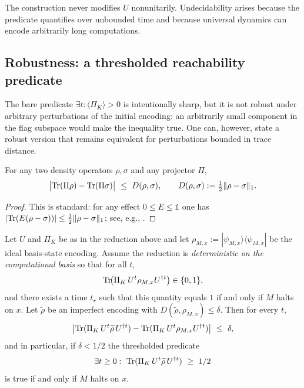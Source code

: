 \begin{remark}
The construction never modifies $U$ nonunitarily.
Undecidability arises because the predicate quantifies over unbounded time and because universal dynamics can encode arbitrarily long computations.
\end{remark}

\subsection{Robustness: a thresholded reachability predicate}
\label{app:reachability_robustness}
The bare predicate $\exists t:\langle\Pi_K\rangle>0$ is intentionally sharp, but it is not robust under arbitrary perturbations of the initial encoding: an arbitrarily small component in the flag subspace would make the inequality true.
One can, however, state a robust version that remains equivalent for perturbations bounded in trace distance.

\begin{lemma}
\label{lem:proj_lipschitz_trace}
For any two density operators $\rho,\sigma$ and any projector $\Pi$,
\begin{equation}
\bigl|\Tr(\Pi\rho)-\Tr(\Pi\sigma)\bigr|\ \le\ D(\rho,\sigma),
\qquad D(\rho,\sigma):=\tfrac12\|\rho-\sigma\|_1.
\end{equation}
\end{lemma}

\begin{proof}
This is standard: for any effect $0\le E\le \mathds{1}$ one has
$|\mathrm{Tr}(E(\rho-\sigma))|\le \tfrac12\|\rho-\sigma\|_1$; see, e.g., \cite{Watrous2018}.
\end{proof}

\begin{proposition}
\label{prop:reachability_threshold_robust}
Let $U$ and $\Pi_K$ be as in the reduction above and let $\rho_{M,x}:=|\psi_{M,x}\rangle\langle\psi_{M,x}|$ be the ideal basis-state encoding.
Assume the reduction is \emph{deterministic on the computational basis} so that for all $t$,
\begin{equation}
\mathrm{Tr}\!\bigl(\Pi_K\,U^t\rho_{M,x}U^{\dagger t}\bigr)\in\{0,1\},
\end{equation}
and there exists a time $t_\star$ such that this quantity equals $1$ if and only if $M$ halts on $x$.
Let $\widetilde\rho$ be an imperfect encoding with
$D(\widetilde\rho,\rho_{M,x})\le\delta$.
Then for every $t$,
\begin{equation}
\bigl|\mathrm{Tr}(\Pi_K\,U^t\widetilde\rho\,U^{\dagger t})-\mathrm{Tr}(\Pi_K\,U^t\rho_{M,x}U^{\dagger t})\bigr|\ \le\ \delta,
\end{equation}
and in particular, if $\delta<1/2$ the thresholded predicate
\begin{equation}
\exists t\ge 0:\ \Tr(\Pi_K\,U^t\widetilde\rho\,U^{\dagger t})\ \ge\ 1/2
\end{equation}
is true if and only if $M$ halts on $x$.
\end{proposition}

